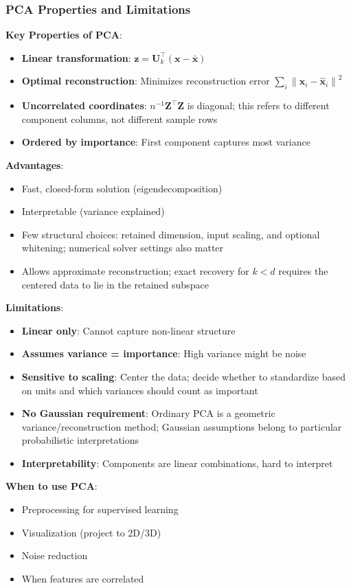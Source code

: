 \documentclass[11pt,twoside]{article}
\numberwithin{equation}{section}
\newcommand{\vect}[1]{\bm{#1}}
\newcommand{\mat}[1]{\bm{#1}}
\newcommand{\norm}[1]{\left\lVert#1\right\rVert}
\theoremstyle{plain}
\theoremstyle{definition}
\theoremstyle{remark}
\newenvironment{keyidea}{
  \begin{tcolorbox}[colback=yellow!5!white,
                    colframe=yellow!50!black,
                    title=Key Idea,
                    breakable,
                    enhanced,
                    sharp corners,
                    boxrule=0.8pt,
                    left=6pt, right=6pt, top=6pt, bottom=6pt]
}{
  \end{tcolorbox}
}
\begin{document}
\subsubsection{PCA Properties and Limitations}

\begin{keyidea}
\textbf{Key Properties of PCA}:
\begin{itemize}
\item \textbf{Linear transformation}: $\vect{z} = \mat{U}_k^\top(\vect{x} - \bar{\vect{x}})$
\item \textbf{Optimal reconstruction}: Minimizes reconstruction error $\sum_i \norm{\vect{x}_i - \hat{\vect{x}}_i}^2$
\item \textbf{Uncorrelated coordinates}: $n^{-1}\mat{Z}^\top\mat{Z}$ is diagonal; this refers to different component columns, not different sample rows
\item \textbf{Ordered by importance}: First component captures most variance
\end{itemize}

\textbf{Advantages}:
\begin{itemize}
\item Fast, closed-form solution (eigendecomposition)
\item Interpretable (variance explained)
\item Few structural choices: retained dimension, input scaling, and optional whitening; numerical solver settings also matter
\item Allows approximate reconstruction; exact recovery for $k<d$ requires the centered data to lie in the retained subspace
\end{itemize}

\textbf{Limitations}:
\begin{itemize}
\item \textbf{Linear only}: Cannot capture non-linear structure
\item \textbf{Assumes variance = importance}: High variance might be noise
\item \textbf{Sensitive to scaling}: Center the data; decide whether to standardize based on units and which variances should count as important
\item \textbf{No Gaussian requirement}: Ordinary PCA is a geometric variance/reconstruction method; Gaussian assumptions belong to particular probabilistic interpretations
\item \textbf{Interpretability}: Components are linear combinations, hard to interpret
\end{itemize}

\textbf{When to use PCA}:
\begin{itemize}
\item Preprocessing for supervised learning
\item Visualization (project to 2D/3D)
\item Noise reduction
\item When features are correlated
\end{itemize}
\end{keyidea}
\end{document}
